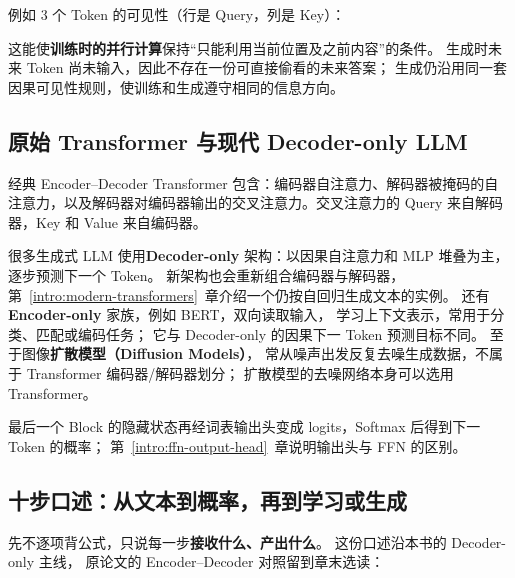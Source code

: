 例如 3 个 Token 的可见性（行是 Query，列是 Key）：



这能使\textbf{训练时的并行计算}保持“只能利用当前位置及之前内容”的条件。
生成时未来 Token 尚未输入，因此不存在一份可直接偷看的未来答案；
生成仍沿用同一套因果可见性规则，使训练和生成遵守相同的信息方向。

\subsection{原始 Transformer 与现代 Decoder-only LLM}
\label{concept:cross-attention}

经典 Encoder--Decoder Transformer 包含：编码器自注意力、解码器被掩码的自注意力，以及解码器对编码器输出的交叉注意力。交叉注意力的 Query 来自解码器，Key 和 Value 来自编码器。

很多生成式 LLM 使用\textbf{Decoder-only} 架构：以因果自注意力和 MLP 堆叠为主，逐步预测下一个 Token。
新架构也会重新组合编码器与解码器，第~\ref*{intro:modern-transformers}~章介绍一个仍按自回归生成文本的实例。
还有\textbf{Encoder-only} 家族，例如 BERT，双向读取输入，
学习上下文表示，常用于分类、匹配或编码任务；
它与 Decoder-only 的因果下一 Token 预测目标不同。
至于图像\textbf{扩散模型（Diffusion Models）}，
常从噪声出发反复去噪生成数据，不属于 Transformer 编码器/解码器划分；
扩散模型的去噪网络本身可以选用 Transformer。

最后一个 Block 的隐藏状态再经词表输出头变成 logits，Softmax 后得到下一 Token 的概率；
第~\ref*{intro:ffn-output-head}~章说明输出头与 FFN 的区别。

\subsection{十步口述：从文本到概率，再到学习或生成}
\label{sec:transformer-ten-steps}

先不逐项背公式，只说每一步\textbf{接收什么、产出什么}。
这份口述沿本书的 Decoder-only 主线，
原论文的 Encoder--Decoder 对照留到章末选读：

